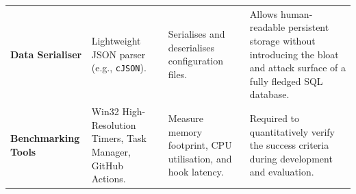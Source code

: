 {\begin{xltabular}{\textwidth}{@{} P{2.5cm} P{2.5cm} L L @{}}
			\textbf{Data Serialiser} & Lightweight JSON parser (e.g., \texttt{cJSON}). & Serialises and deserialises configuration files. & Allows human-readable persistent storage without introducing the bloat and attack surface of a fully fledged SQL database. \\

			\textbf{Benchmarking Tools} & Win32 High-Resolution Timers, Task Manager, GitHub Actions. & Measure memory footprint, CPU utilisation, and hook latency. & Required to quantitatively verify the success criteria during development and evaluation. \\
		\end{xltabular}
	}
